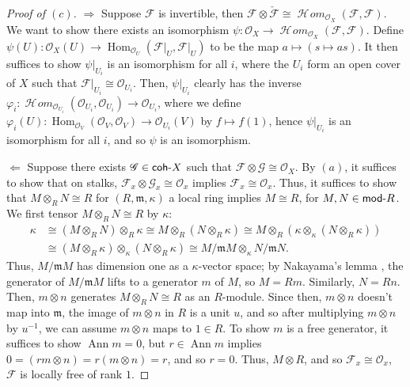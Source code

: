 \documentclass[10pt]{article}
\theoremstyle{definition}
\theoremstyle{remark}
\numberwithin{equation}{section}
\numberwithin{figure}{subsubsection}
\DeclareMathOperator{\Ann}{Ann}
\DeclareMathOperator{\Hom}{Hom}
\newcommand{\FF}{\mathscr{F}}
\newcommand{\GG}{\mathscr{G}}
\newcommand{\OO}{\mathcal{O}}
\DeclareMathOperator{\HHom}{\mathscr{H}\!\mathit{om}}
\newcommand{\Mod}{\mathsf{mod}\mathchar`-}
\newcommand{\coh}{\mathsf{coh}\mathchar`-}
\begin{document}
\begin{proof}[Proof of $(c)$]
  $\Rightarrow$ Suppose $\FF$ is invertible, then $\FF \otimes \check{\FF} \cong \HHom_{\OO_X}(\FF,\FF)$. We want to show there exists an isomorphism $\psi\colon\OO_X\to\HHom_{\OO_X}(\FF,\FF)$. Define $\psi(U) \colon \OO_X(U) \to \Hom_{\OO_U}(\FF\vert_U,\FF\vert_U)$ to be the map $a \mapsto (s \mapsto as)$. It then suffices to show $\psi\vert_{U_i}$ is an isomorphism for all $i$, where the $U_i$ form an open cover of $X$ such that $\FF\vert_{U_i} \cong \OO_{U_i}$. Then, $\psi\vert_{U_i}$ clearly has the inverse $\varphi_i\colon \HHom_{\OO_{U_i}}(\OO_{U_i},\OO_{U_i}) \to \OO_{U_i}$, where we define $\varphi_i(U) \colon \Hom_{\OO_{V}}(\OO_{V},\OO_{V}) \to \OO_{U_i}(V)$ by $f \mapsto f(1)$, hence $\psi\vert_{U_i}$ is an isomorphism for all $i$, and so $\psi$ is an isomorphism.
  \par $\Leftarrow$ Suppose there exists $\GG \in \coh X$ such that $\FF \otimes \GG \cong \OO_X$. By $(a)$, it suffices to show that on stalks, $\FF_x \otimes \GG_x \cong \OO_x$ implies $\FF_x \cong \OO_x$. Thus, it suffices to show that $M \otimes_R N \cong R$ for $(R,\mathfrak{m},\kappa)$ a local ring implies $M \cong R$, for $M,N \in \Mod R$. We first tensor $M \otimes_R N \cong R$ by $\kappa$:
  \begin{align*}
    \kappa &\cong (M \otimes_R N) \otimes_R \kappa \cong M \otimes_R (N \otimes_R \kappa) \cong M \otimes_R (\kappa \otimes_\kappa (N \otimes_R \kappa))\\
    &\cong (M\otimes_R\kappa) \otimes_\kappa (N\otimes_R\kappa) \cong M/\mathfrak{m}M \otimes_\kappa N/\mathfrak{m}N.
  \end{align*}
  Thus, $M/\mathfrak{m}M$ has dimension one as a $\kappa$-vector space; by Nakayama's lemma \cite[Prop.~2.8]{AM69}, the generator of $M/\mathfrak{m}M$ lifts to a generator $m$ of $M$, so $M = Rm$. Similarly, $N = Rn$. Then, $m \otimes n$ generates $M \otimes_R N \cong R$ as an $R$-module. Since then, $m \otimes n$ doesn't map into $\mathfrak{m}$, the image of $m \otimes n$ in $R$ is a unit $u$, and so after multiplying $m \otimes n$ by $u^{-1}$, we can assume $m\otimes n$ maps to $1 \in R$. To show $m$ is a free generator, it suffices to show $\Ann m = 0$, but $r \in \Ann m$ implies $0 = (rm \otimes n) = r(m \otimes n) = r$, and so $r = 0$. Thus, $M \otimes R$, and so $\FF_x \cong \OO_x$, $\FF$ is locally free of rank $1$.
\end{proof}
\end{document}
